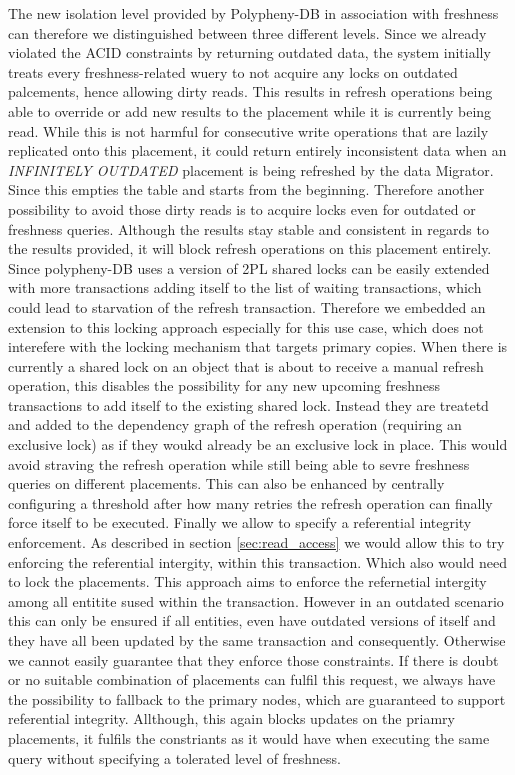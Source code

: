 The new isolation level provided by Polypheny-DB in association with freshness can therefore we distinguished between three different levels.
Since we already violated the ACID constraints by returning outdated data, the system initially treats every freshness-related wuery to not acquire any locks on outdated palcements, 
hence allowing dirty reads. This results in refresh operations being able to override or add new results to the placement while it is currently being read. 
While this is not harmful for consecutive write operations that are lazily replicated onto this placement, it could return entirely inconsistent data when 
an \emph{INFINITELY OUTDATED} placement is being refreshed by the data Migrator. Since this empties the table and starts from the beginning. 
Therefore another possibility to avoid those dirty reads is to acquire locks even for outdated or freshness queries. Although the results stay stable and consistent in regards to
the results provided, it will block refresh operations on this placement entirely. Since polypheny-DB uses a version of 2PL shared locks can be easily extended with more transactions adding
itself to the list of waiting transactions, which could lead to starvation of the refresh transaction. Therefore we embedded an extension to this locking approach especially for this use case, which does not interefere with 
the locking mechanism that targets primary copies. When there is currently a shared lock on an object that is about to receive a manual refresh operation, this disables the possibility
for any new upcoming freshness transactions to add itself to the existing shared lock. Instead they are treatetd and added to the dependency graph of the refresh operation (requiring an exclusive lock)
as if they woukd already be an exclusive lock in place. This would avoid straving the refresh operation while still being able to sevre freshness queries on different placements.
This can also be enhanced by centrally configuring  a threshold after how many retries the refresh operation can finally force itself to be executed.
Finally we allow to specify a referential integrity enforcement. As described in section \ref{sec:read_access} we would allow this to try enforcing the referential intergity,
within this transaction. Which also would need to lock the placements. This approach aims to enforce the refernetial intergity among all entitite sused within the transaction.
However in an outdated scenario this can only be ensured if all entities, even have outdated versions of itself and they have all been updated by the same 
transaction and consequently. Otherwise we cannot easily guarantee that they enforce those constraints. If there is doubt or no suitable combination of placements can fulfil this request,
we always have the possibility to fallback to the primary nodes, which are guaranteed to support referential integrity. Allthough, this again blocks updates on the priamry placements,
it fulfils the constriants as it would have when executing the same query without specifying a tolerated level of freshness.

